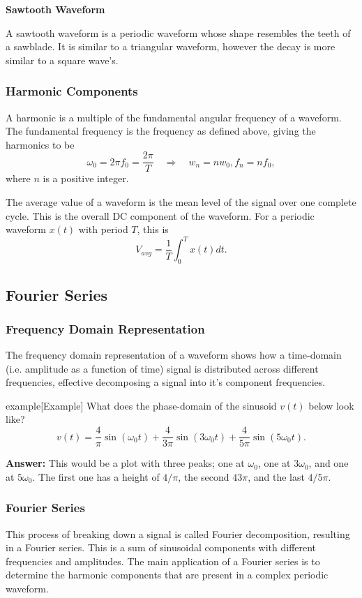 \documentclass{article}
\begin{document}
\noindent\textbf{Sawtooth Waveform}

A sawtooth waveform is a periodic waveform whose shape resembles the teeth of a sawblade. It is similar to a triangular waveform, however the decay is more similar to a square wave's.

\subsubsection{Harmonic Components}
A harmonic is a multiple of the fundamental angular frequency of a waveform. The fundamental frequency is the frequency as defined above, giving the harmonics to be
\[
    \omega _0=2\pi f_0=\frac{2\pi }{T}\quad\Rightarrow\quad w_n=nw_0,f_n=nf_0,
\]
where $n$ is a positive integer.

The average value of a waveform is the mean level of the signal over one complete cycle. This is the overall DC component of the waveform. For a periodic waveform $x(t)$ with period $T$, this is
\[
    V_{avg}=\frac{1}{T}\int_0^Tx(t)dt.
\]

\subsection{Fourier Series}
\subsubsection{Frequency Domain Representation}
The frequency domain representation of a waveform shows how a time-domain (i.e. amplitude as a function of time) signal is distributed across different frequencies, effective decomposing a signal into it's component frequencies.

\begin{callout}{example}[Example]
\label{example:t1-e2}
What does the phase-domain of the sinusoid $v(t)$ below look like?
\[
    v(t)=\frac{4}{\pi }\sin(\omega_0t) + \frac{4}{3\pi }\sin(3\omega_0t)+\frac{4}{5\pi }\sin(5\omega_0t).
\]

\textbf{Answer:}
This would be a plot with three peaks; one at $\omega_0$, one at $3\omega _0$, and one at $5\omega_0$. The first one has a height of $4/\pi $, the second $43\pi $, and the last $4/5\pi $.
\end{callout}

\subsubsection{Fourier Series}
This process of breaking down a signal is called Fourier decomposition, resulting in a Fourier series. This is a sum of sinusoidal components with different frequencies and amplitudes.
The main application of a Fourier series is to determine the harmonic components that are present in a complex periodic waveform.
\end{document}
